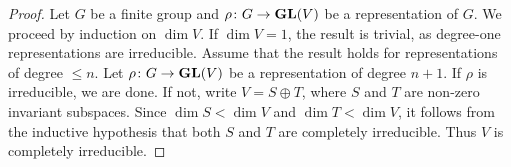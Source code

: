 \begin{proof}
    Let $G$ be a finite group and $\rho\colon G\to\mathbf{GL}(V)$ be a representation of $G$. We proceed
    by induction on $\dim V$.
    If $\dim V=1$, the result is trivial, as degree-one representations are irreducible. Assume that
    the result holds for representations of degree $\leq n$. Let $\rho\colon G\to\mathbf{GL}(V)$ be a representation
    of degree $n+1$. If $\rho$ is irreducible, we are done. If not, write $V=S\oplus T$, where $S$ and $T$
    are non-zero invariant subspaces. Since $\dim S<\dim V$ and $\dim T<\dim V$, it follows from
    the inductive hypothesis that
    both $S$ and $T$ are completely irreducible. Thus $V$ is completely irreducible.
\end{proof}

